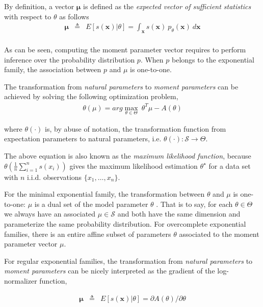 \documentclass[11pt, oneside]{article}   	%
\newcommand{\bm}{\mathbf}
\numberwithin{figure}{section}
\numberwithin{equation}{section}
\numberwithin{table}{section}
\newcommand{\e}[1]{E\left[ #1 \right]}
\theoremstyle{definition}
\begin{document}
By definition, a vector $\bm \mu$ is defined as the \emph{expected vector of sufficient statistics} with respect to $\theta$ as follows
\begin{equation}
\label{Equation:NaturalToMoment}
\begin{array}{lll}
\bm \mu & \triangleq & \e{s(\bm x)|\theta}  = \int_{\bm x} s(\bm x)~p_\theta(\bm x)~d\bm x\\
\end{array}
\end{equation}

As can be seen, computing the moment parameter vector requires to perform inference over the probability distribution $p$. When $p$ belongs to the exponential family, the association between $p$ and $\mu$ is one-to-one.


The transformation from \emph{natural parameters} to  \emph{moment parameters} can be achieved by solving the following optimization problem,
 \begin{eqnarray}
\label{Equation:MomentToNatural}
\theta(\mu) = arg\max_{\theta\in\Theta}~\theta^T\mu -A(\theta)
\end{eqnarray}

\noindent where $\theta (\cdot)$ is, by abuse of notation, the transformation function from expectation parameters to natural parameters, i.e. $\theta (\cdot) : \mathcal{S} \rightarrow \Theta$.

The above equation is also known as the \emph{maximum likelihood function}, because $\theta(\frac{1}{n}\sum_{i=1}^n s(x_i))$ gives the maximum likelihood estimation $\theta^\star$ for a data set with $n$ i.i.d. observations $\{x_1,\ldots,x_n\}$.

For the minimal exponential family, the transformation between $\theta$ and $\mu$ is one-to-one: $\mu$ is a dual set of the model parameter $\theta$ \cite{amari1985differential}. That is to say, for each $\theta\in \Theta$ we always have an associated $\mu\in\mathcal{S}$ and both have the same dimension and parameterize the same probability distribution. For overcomplete exponential families,  there is an entire affine subset of parameters $\theta$ associated to the moment parameter vector $\mu$. 

For regular exponential families, the transformation from \emph{natural parameters} to \emph{moment parameters} can be nicely interpreted as the gradient of the log-normalizer function, 

\begin{equation}
\label{Equation:NaturalToMomentRegular}
\begin{array}{lll}
\bm \mu & \triangleq & \e{s(\bm x)|\theta}  = \partial A(\theta)/\partial \theta \\
\end{array}
\end{equation}
\end{document}
